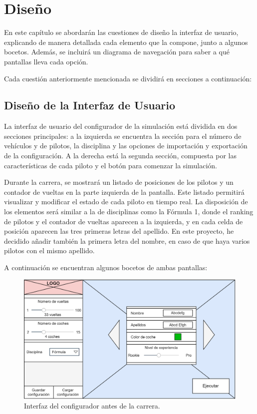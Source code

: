 \chapter{Diseño}

En este capítulo se abordarán las cuestiones de diseño la interfaz de usuario, explicando de manera detallada cada elemento que la compone, junto a algunos bocetos. Además, se incluirá un diagrama de navegación para saber a qué pantallas lleva cada opción.

\bigskip

Cada cuestión anteriormente mencionada se dividirá en secciones a continuación:

\section{Diseño de la Interfaz de Usuario}

La interfaz de usuario del configurador de la simulación está dividida en dos secciones principales: a la izquierda se encuentra la sección para el número de vehículos y de pilotos, la disciplina y las opciones de importación y exportación de la configuración. A la derecha está la segunda sección, compuesta por las características de cada piloto y el botón para comenzar la simulación.

\bigskip

Durante la carrera, se mostrará un listado de posiciones de los pilotos y un contador de vueltas en la parte izquierda de la pantalla. Este listado permitirá visualizar y modificar el estado de cada piloto en tiempo real. La disposición de los elementos será similar a la de disciplinas como la Fórmula 1, donde el ranking de pilotos y el contador de vueltas aparecen a la izquierda, y en cada celda de posición aparecen las tres primeras letras del apellido. En este proyecto, he decidido añadir también la primera letra del nombre, en caso de que haya varios pilotos con el mismo apellido.

\bigskip

A continuación se encuentran algunos bocetos de ambas pantallas:

\begin{figure}[H]
    \centering
    \includegraphics[width=\textwidth]{imagenes/pag1.png}
    \caption{Interfaz del configurador antes de la carrera.}
\end{figure}

